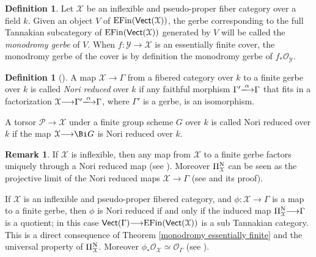 \documentclass[12pt,reqno]{amsart}
\theoremstyle{plain}
\theoremstyle{definition}
\newtheorem{defn}[thm]{Definition}
\newtheorem{rmk}[thm]{Remark}
\numberwithin{thm}{section}
\newcounter{x}\setcounter{x}{1}
\theoremstyle{plain}
\begin{document}
\begin{defn}\label{monodromy gerbe}
Let ${\mathcal{X}}$ be an inflexible and pseudo-proper fiber category over a field $k$. Given an object
$V$ of ${{\rm EFin}}({\text{\sf Vect}}({\mathcal{X}}))$, the gerbe corresponding to the full Tannakian subcategory of
${{\rm EFin}}({\text{\sf Vect}}({\mathcal{X}}))$ generated by $V$ will be called the {\it monodromy gerbe} of $V$. When
$f \colon {\mathcal{Y}} {\longrightarrow} {\mathcal{X}}$ is an essentially finite cover, the monodromy gerbe of the cover
is by definition the monodromy gerbe of $f_* {\mathcal{O}}_{\mathcal{Y}}$.
\end{defn}

\begin{defn}[{\cite[Definition 5.10]{BV}}]\label{Nori reduced}
A map ${\mathcal{X}}{\longrightarrow} \Gamma$ from a fibered category over $k$ to a finite gerbe over
$k$ is called \emph{Nori reduced} over $k$ if any faithful morphism
$\Gamma'{\xlongrightarrow{\alpha}} \Gamma$ that fits in a factorization
${\mathcal{X}}{\longrightarrow} \Gamma'{\xlongrightarrow{\alpha}} \Gamma$, where $\Gamma'$ is a gerbe, is an isomorphism.
 
 A torsor ${\mathcal{P}}{\longrightarrow} {\mathcal{X}}$ under a finite group scheme $G$ over $k$ is called Nori reduced over $k$ if the map ${\mathcal{X}}{\longrightarrow} \Bi G$ is Nori reduced over $k$.
\end{defn}

\begin{rmk}
 If ${\mathcal{X}}$ is inflexible, then any map from ${\mathcal{X}}$ to a finite gerbe factors uniquely
through a Nori reduced map (see \cite[Lemma 5.12]{BV}). Moreover $\Pi^{\textup{N}}_{\mathcal{X}}$ can
be seen as the projective limit of the Nori reduced maps ${\mathcal{X}}{\longrightarrow} \Gamma$ (see
\cite[Theorem 5.7]{BV} and its proof).
 
If ${\mathcal{X}}$ is an inflexible and pseudo-proper fibered category, and $\phi\colon {\mathcal{X}}{\longrightarrow} 
\Gamma$ is a map to a finite gerbe, then $\phi$ is Nori reduced if and only if the induced 
map $\Pi^{\textup{N}}_{\mathcal{X}}{\longrightarrow} \Gamma$ is a quotient; in this case ${\text{\sf Vect}}(\Gamma){\longrightarrow} 
{{\rm EFin}}({\text{\sf Vect}}({\mathcal{X}}))$ is a sub Tannakian category. This is a direct consequence of Theorem \ref{monodromy 
essentially finite} and the universal property of $\Pi^{\textup{N}}_{\mathcal{X}}$. Moreover 
$\phi_*{\mathcal{O}_{\mathcal{X}}}\simeq {\mathcal{O}_{\Gamma}}$ (see \cite[Lemma 7.11]{BV}).
\end{rmk}
\end{document}
